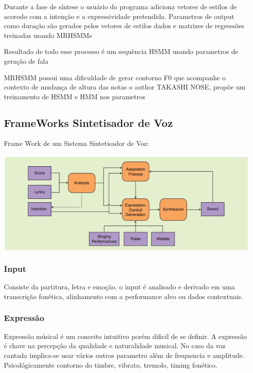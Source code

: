 		Durante a fase de síntese o usuário do programa adiciona vetores de estilos de acorodo com a intenção e a expressividade pretendida.
		Parametros de output como duração são gerados pelos vetores de estilos dados e matrizes de regressões treinadas usando MRHSMMs
		
		Resultado de todo esse processo é um sequência HSMM usando parametros de geração de fala
		
		MRHSMM possui uma dificuldade de gerar contorno F0 que acompanhe o contexto de mudança de altura das notas o author TAKASHI NOSE, propõe um treinamento de HSMM e HMM nos parametros 
		
	
	\subsection{FrameWorks Sintetisador de Voz}
	
		Frame Work de um Sistema Sintetisador de Voz:
		
		\includegraphics{frameWork.png}
		
		\subsubsection{Input}
		Consiste da partitura, letra e emoção.
		o input é analisado e derivado em uma transcrição fonética, alinhamento com a performance alvo ou dados contextuais.\cite{FrameWork}\linebreak
		
		\subsubsection{Expressão}
		Expressão músical é um conceito intuitivo porém dificil de se definir. A expressão é chave na percepção da qualidade e naturalidade musical.
		No caso da voz cantada implica-se usar vários outros parametro além de frequencia e amplitude. Psicológicamente contorno do timbre, vibrato, tremolo, timing fonético.\cite{FrameWork}\linebreak
	
